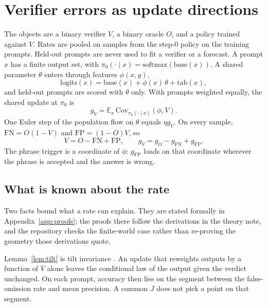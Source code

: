 \section{Verifier errors as update directions}
\label{sec:theory}

The objects are a binary verifier $V$, a binary oracle $O$, and a policy trained against $V$.
Rates are pooled on samples from the step-0 policy on the training prompts.
Held-out prompts are never used to fit a verifier or a forecast.
A prompt $x$ has a finite output set, with $\pi_0(\cdot \mid x) = \mathrm{softmax}(\mathrm{base}(x))$.
A shared parameter $\theta$ enters through features $\phi(x,y)$,
\begin{equation}
\mathrm{logits}(x) = \mathrm{base}(x) + \phi(x)\,\theta + \mathrm{tab}(x),
\end{equation}
and held-out prompts are scored with $\theta$ only.
With prompts weighted equally, the shared update at $\pi_0$ is
\begin{equation}
g_V = \mathbb{E}_x \,\mathrm{Cov}_{\pi_0(\cdot \mid x)}(\phi, V).
\end{equation}
One Euler step of the population flow on $\theta$ equals $\eta g_V$.
On every sample, $\mathrm{FN} = O(1-V)$ and $\mathrm{FP} = (1-O)V$, so
\begin{equation}
\label{eq:split}
V = O - \mathrm{FN} + \mathrm{FP}, \qquad g_V = g_O - g_{\mathrm{FN}} + g_{\mathrm{FP}}.
\end{equation}
The phrase trigger is a coordinate of $\phi$: $g_{\mathrm{FP}}$ loads on that coordinate wherever the phrase is accepted and the answer is wrong.

\subsection{What is known about the rate}

Two facts bound what a rate can explain.
They are stated formally in Appendix~\ref{app:proofs}; the proofs there follow the derivations in the theory note, and the repository checks the finite-world case rather than re-proving the geometry those derivations quote.

Lemma~\ref{lem:tilt} is tilt invariance \citep{mroueh2025tilt,dorner2025tilt}.
An update that reweights outputs by a function of $V$ alone leaves the conditional law of the output given the verdict unchanged.
On each prompt, accuracy then lies on the segment between the false-omission rate and mean precision.
A common $J$ does not pick a point on that segment.


